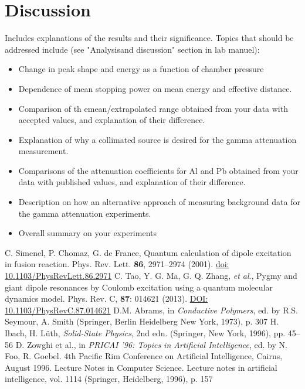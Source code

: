 \documentclass[10pt,aps,prb,twocolumn, nofootinbib]{revtex4-1}
\begin{document}
\section{Discussion}
Includes explanations of the results and their significance.  Topics that should be addressed include (see "Analysisand discussion" section in lab manuel):

\begin{itemize}
	\item Change in peak shape and energy as a function of chamber pressure
	\item Dependence of mean stopping power on mean energy and effective distance.
	\item Comparison of th emean/extrapolated range obtained from your data with accepted values, and explanation of their difference.
	\item Explanation of why a collimated source is desired for the gamma attenuation measurement.
	\item Comparisons of the attenuation coefficients for Al and Pb obtained from your data with published values, and explanation of their difference.
	\item Description on how an alternative approach of measuring background data for the gamma attenuation experiments.
	\item Overall summary on your experiments
\end{itemize}


\begin{thebibliography}{99}
 C. Simenel, P. Chomaz, G. de France, Quantum calculation of dipole excitation in fusion reaction. Phys. Rev. Lett. {\bf 86}, 2971--2974 (2001). \href{http://dx.doi.org/10.1103/PhysRevLett.86.2971}{doi: 10.1103/PhysRevLett.86.2971}
 C. Tao, Y. G. Ma, G. Q. Zhang, \emph{et al}., Pygmy and giant dipole resonances by Coulomb excitation using a quantum molecular dynamics model. Phys. Rev. C, {\bf 87}: 014621 (2013). \href{http://dx.doi.org/10.1103/PhysRevC.87.014621}{DOI: 10.1103/PhysRevC.87.014621} 
 D.M. Abrams, in {\it Conductive Polymers}, ed. by R.S. Seymour, A. Smith (Springer, Berlin Heidelberg New York, 1973), p. 307 
 H. Ibach, H. Lüth, {\it Solid-State Physics}, 2nd edn. (Springer, New York, 1996), pp. 45–56 
 D. Zowghi et al., in {\it PRICAI '96: Topics in Artificial Intelligence}, ed. by N. Foo, R. Goebel. 4th Pacific Rim Conference on Artificial Intelligence, Cairns, August 1996. Lecture Notes in Computer Science. Lecture notes in artificial intelligence, vol. 1114 (Springer, Heidelberg, 1996), p. 157 
\end{thebibliography}
\end{document}
